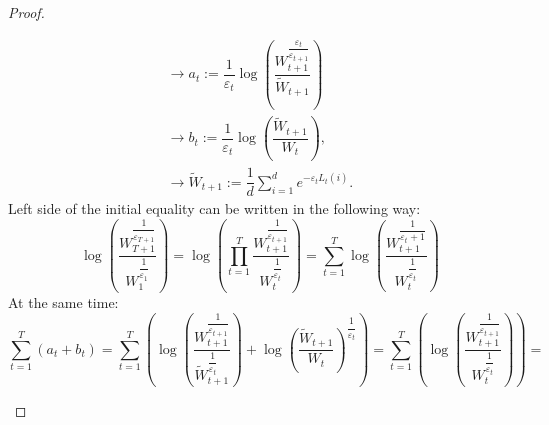 \documentclass[12pt]{report}
\begin{document}
\begin{proof}
\begin{enumerate}
        \[
            \begin{array}{l}
                \displaystyle \rightarrow a_t := \dfrac{1}{\varepsilon_t} \log \left(\dfrac{W_{t+1}^{\dfrac{\varepsilon
                _t}{\varepsilon
                _{t+1}}}}{\widetilde{W}_{t+1}}\right)\\[0.5cm]
                \displaystyle \rightarrow b_t := \dfrac{1}{\varepsilon_t} \log \left(\dfrac{\widetilde{W}_{t+1}}{W_t}\right), \\[0.5cm]
                \displaystyle 
                \rightarrow \widetilde{W}_{t+1} := \dfrac{1}{d} \sum\limits_{i=1}^d e^{\displaystyle  -\varepsilon_t L_t(i)}. 
            \end{array}  
        \]
        Left side of the initial equality can be written in the following way:
        \[
            \log \left(\dfrac{W_{T+1}^{\dfrac{1}{\varepsilon_{T+1}}}}{W_1^{\dfrac{1}{\varepsilon_1}}}\right)  = \log \left(\prod\limits_{t=1}^{T} \dfrac{W_{t+1}^{\dfrac{1}{\varepsilon_{t+1}}}}{W_t^{\dfrac{1}{\varepsilon_t}}}\right) = \sum\limits_{t=1}^T \log \left(\dfrac{W_{t+1}^{\dfrac{1}{\varepsilon_t + 1}}}{W_t^{\dfrac{1}{\varepsilon_t}}}\right)
        \]
        At the same time:
        \[
            \sum\limits_{t=1}^T (a_t + b_t) = \sum\limits_{t=1}^T \left(\log\left(\dfrac{W_{t+1}^{\dfrac{1}{\varepsilon_{t+1}}}}{\widetilde{W}_{t+1}^{\dfrac{1}{\varepsilon_t}}}\right) + \log \left(\dfrac{\widetilde{W}_{t+1}}{W_t}\right)^{\dfrac{1}{\varepsilon_t}} \right) = \sum\limits_{t=1}^T \left(\log \left(\dfrac{W_{t+1}^{\dfrac{1}{\varepsilon_{t+1}}}}{W_t^{\dfrac{1}{\varepsilon_t}}}\right)\right) = 
\]
\end{enumerate}
\end{proof}
\end{document}
